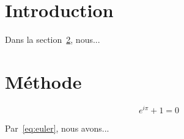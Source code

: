 \documentclass{article}
\begin{document}
\section{Introduction}
\label{sec:intro}
Dans la section~\ref{sec:method},
nous...

\section{Méthode}
\label{sec:method}

\begin{equation}
\label{eq:euler}
e^{i\pi} + 1 = 0
\end{equation}

Par~\eqref{eq:euler}, nous avons...
\end{document}
